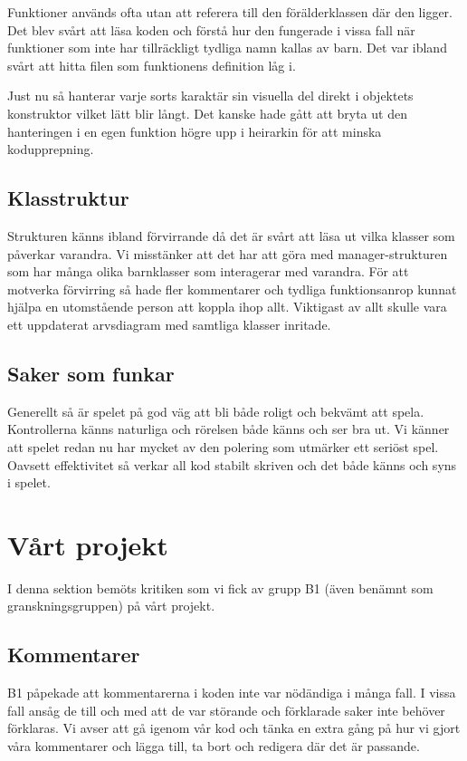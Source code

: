 \documentclass{TDP005mall}
\begin{document}
Funktioner används ofta utan att referera till den förälderklassen där den ligger. Det blev svårt att läsa koden och förstå hur den fungerade i vissa fall när funktioner som inte har tillräckligt tydliga namn kallas av barn. Det var ibland svårt att hitta filen som funktionens definition låg i.

Just nu så hanterar varje sorts karaktär sin visuella del direkt i objektets konstruktor vilket lätt blir långt. Det kanske hade gått att bryta ut den hanteringen i en egen funktion högre upp i heirarkin för att minska kodupprepning.

\subsection{Klasstruktur}
Strukturen känns ibland förvirrande då det är svårt att läsa ut vilka klasser som påverkar varandra. Vi misstänker att det har att göra med manager-strukturen som har många olika barnklasser som interagerar med varandra. För att motverka förvirring så hade fler kommentarer och tydliga funktionsanrop kunnat hjälpa en utomstående person att koppla ihop allt. Viktigast av allt skulle vara ett uppdaterat arvsdiagram med samtliga klasser inritade.


\subsection{Saker som funkar}
Generellt så är spelet på god väg att bli både roligt och bekvämt att spela. Kontrollerna känns naturliga och rörelsen både känns och ser bra ut. Vi känner att spelet redan nu har mycket av den polering som utmärker ett seriöst spel. Oavsett effektivitet så verkar all kod stabilt skriven och det både känns och syns i spelet. 


\section{Vårt projekt}
I denna sektion bemöts kritiken som vi fick av grupp B1 (även benämnt som granskningsgruppen) på vårt projekt.

\subsection{Kommentarer}
B1 påpekade att kommentarerna i koden inte var nödändiga i många fall. I vissa fall ansåg de till och med att de var störande och förklarade saker inte behöver förklaras. Vi avser att gå igenom vår kod och tänka en extra gång på hur vi gjort våra kommentarer och lägga till, ta bort och redigera där det är passande.
\end{document}
